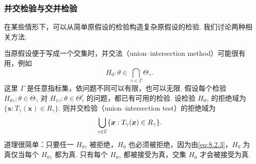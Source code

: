 \subsubsection{并交检验与交并检验}\label{sec:8.2.3}
在某些情形下，可以从简单原假设的检验构造复杂原假设的检验. 我们讨论两种相关方法.

当原假设便于写成一个交集时，并交法（union–intersection method）可能很有用，例如
\begin{equation}\label{eq:8.2.3}H_0:\theta\in\bigcap_{\gamma\in\Gamma}\Theta_\gamma.\end{equation}
这里 $\Gamma$ 是任意指标集，依问题不同可以有限，也可以无限. 假设每个检验 $H_{0\gamma}:\theta\in\Theta_\gamma$ 对 $H_{1\gamma}:\theta\in\Theta_\gamma^c$ 的问题，都已有可用的检验. 设检验 $H_{0\gamma}$ 的拒绝域为 $\{\boldsymbol x:T_\gamma(\boldsymbol x)\in R_\gamma\}$. 则并交检验（union–intersection test）的拒绝域为
\begin{equation}\label{eq:8.2.4}\index{SI0522@并交}\bigcup_{\gamma\in\Gamma}\{\boldsymbol x:T_\gamma(\boldsymbol x)\in R_\gamma\}.\end{equation}
道理很简单：只要任一 $H_{0\gamma}$ 被拒绝，$H_0$ 也必须被拒绝，因为由\eqref{eq:8.2.3}，$H_0$ 为真仅当每个 $H_{0\gamma}$ 都为真. 只有每个 $H_{0\gamma}$ 都被接受为真，交集 $H_0$ 才会被接受为真.

